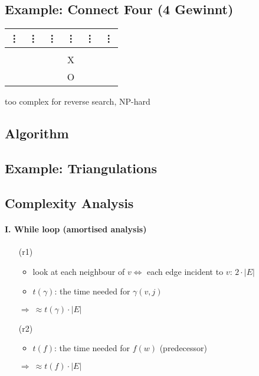 \documentclass[11pt]{article}
\begin{document}
\subsection{Example: Connect Four (4 Gewinnt)}

\begin{tabular}{| c | c | c | c | c | c |}
\vdots & \vdots & \vdots & \vdots & \vdots & \vdots \\
\hline
& & & & & \\
\hline
& & & X & & \\
\hline
& & & O & & \\
\hline
\end{tabular} \newline

too complex for reverse search, NP-hard

\subsection{Algorithm}





\subsection{Example: Triangulations}

\subsubsection{}

\subsubsection{}

\subsection{Complexity Analysis}

\paragraph{I. While loop (amortised analysis)}

\begin{itemize}

\item[(r1)]
	\begin{itemize}
	\item look at each neighbour of $ v \Leftrightarrow $ each edge incident to $ v $: $ 2 \cdot | E | $
	\item $ t ( \gamma ) $: the time needed for $ \gamma(v, j) $
	\end{itemize}
	$ \Rightarrow ~\approx t(\gamma ) \cdot | E | $
\item[(r2)]
	\begin{itemize}
	\item $ t(f) $: the time needed for $ f(w) $ (predecessor)
	\end{itemize}
	$ \Rightarrow ~\approx t(f ) \cdot | E | $

\end{itemize}
\end{document}
